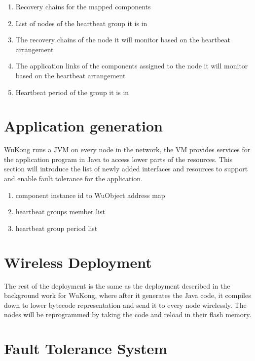 \begin{enumerate}
\item Recovery chains for the mapped components
\item List of nodes of the heartbeat group it is in
\item The recovery chains of the node it will monitor based on
the heartbeat arrangement
\item The application links of the components assigned to the node it will
monitor based on the heartbeat arrangement
\item Heartbeat period of the group it is in
\end{enumerate}

\section{Application generation}

WuKong runs a JVM on every node in the network, the VM provides services for
the application program in Java to access lower parts of the resources.
This section will introduce the list of newly added interfaces and resources to
support and enable fault tolerance for the application.

\begin{enumerate}
\item component instance id to WuObject address map
\item heartbeat groups member list
\item heartbeat group period list
\end{enumerate}

\section{Wireless Deployment}

The rest of the deployment is the same as the deployment described in the
background work for WuKong, where after it generates the Java code, it compiles
down to lower bytecode representation and send it to every node wirelessly. The
nodes will be reprogrammed by taking the code and reload in their flash memory.




\section{Fault Tolerance System}

